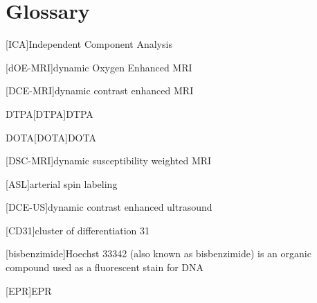 
\chapter{Glossary}




\begin{acronym}

[ICA]{Independent Component Analysis}%

[dOE-MRI]{dynamic Oxygen Enhanced MRI}%

[DCE-MRI]{dynamic contrast enhanced MRI}

\acs{DTPA}[DTPA]{DTPA}

\acs{DOTA}[DOTA]{DOTA}

[DSC-MRI]{dynamic susceptibility weighted MRI}

[ASL]{arterial spin labeling}

[DCE-US]{dynamic contrast enhanced ultrasound}%

[CD31]{cluster of differentiation 31}%

[bisbenzimide]{Hoechst 33342 (also known as bisbenzimide) is an organic compound used as a fluorescent stain for DNA}

[EPR]{EPR}%


\end{acronym}
